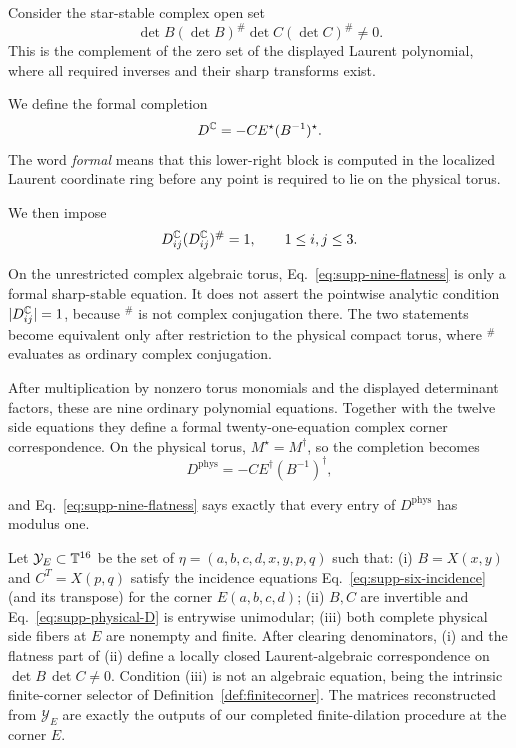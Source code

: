 Consider the star-stable complex open set
\begin{equation}
\det B(\det B)^\#\det C(\det C)^\#\ne0.
\label{eq:supp-complex-open}
\end{equation}
This is the complement of the zero set of the displayed Laurent polynomial, where all required inverses and their sharp transforms exist.

We define the formal completion
\begin{equation}
D^{\mathbb C}=-CE^\star(B^{-1})^\star.
\label{eq:supp-D}
\end{equation}
The word \emph{formal} means that this lower-right block is computed in the localized Laurent coordinate ring before any point is required to lie on the physical torus.

We then impose
\begin{equation}
D^{\mathbb C}_{ij}(D^{\mathbb C}_{ij})^\#=1,\qquad 1\le i,j\le3.
\label{eq:supp-nine-flatness}
\end{equation}

On the unrestricted complex algebraic torus, Eq.~\eqref{eq:supp-nine-flatness} is only a formal sharp-stable equation. It does not assert the pointwise analytic condition $|D^{\mathbb C}_{ij}|=1$, because $^\#$ is not complex conjugation there. The two statements become equivalent only after restriction to the physical compact torus, where $^\#$ evaluates as ordinary complex conjugation.

After multiplication by nonzero torus monomials and the displayed determinant factors, these are nine ordinary polynomial equations. Together with the twelve side equations they define a formal twenty-one-equation complex corner correspondence. On the physical torus, $M^\star=M^\dagger$, so the completion becomes
\begin{equation}
D^{\mathrm{phys}}=-CE^\dagger(B^{-1})^\dagger,
\label{eq:supp-physical-D}
\end{equation}

and Eq.~\eqref{eq:supp-nine-flatness} says exactly that every entry of $D^{\mathrm{phys}}$ has modulus one.

\begin{proposition}
\label{prop:supp-one-corner}
Let $\mathcal Y_E\subset\mathbb T^{16}$ be the set of $\eta=(a,b,c,d,x,y,p,q)$ such that: (i) $B=X(x,y)$ and $C^T=X(p,q)$ satisfy the incidence equations Eq.~\eqref{eq:supp-six-incidence} (and its transpose) for the corner $E(a,b,c,d)$; (ii) $B,C$ are invertible and Eq.~\eqref{eq:supp-physical-D} is entrywise unimodular; (iii) both complete physical side fibers at $E$ are nonempty and finite.  {After clearing denominators, (i) and the flatness part of (ii) define a locally closed Laurent-algebraic correspondence on $\det B\,\det C\ne0$.} Condition (iii) is not an algebraic equation, being the intrinsic finite-corner selector of Definition~\ref{def:finitecorner}.  The matrices reconstructed from $\mathcal Y_E$ are exactly the outputs of our completed finite-dilation procedure at the corner $E$.
\end{proposition}

